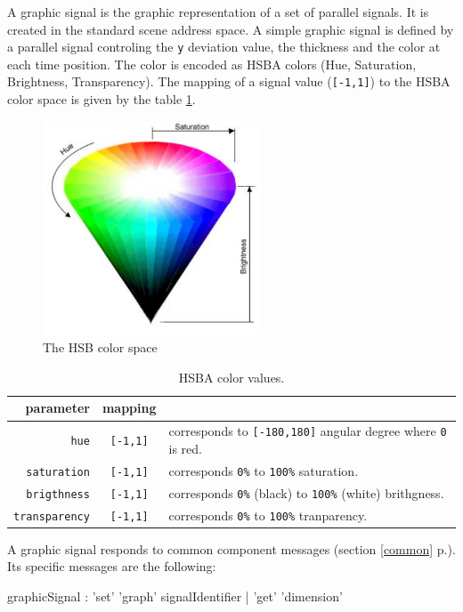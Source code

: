 \documentclass[a4paper,twoside]{report}
\newcommand{\fullref}[1]	{\ref{#1} p.\pageref{#1}}
\newcommand{\OSC}[1]		{\texttt{#1}}
\newcommand{\values}[1]		{\texttt{#1}}
\begin{document}
A graphic signal is the graphic representation of a set of parallel signals. It is created in the standard scene address space. A simple graphic signal is defined by a parallel signal controling the \values{y} deviation value, the thickness and the color at each time position. The color is encoded as HSBA colors (Hue, Saturation, Brightness, Transparency). The mapping of a signal value  (\values{[-1,1]}) to the HSBA color space is given by the table \ref{hsbamap}. 

\begin{figure}[h]
	\centering \includegraphics[width=65mm]{imgs/hsb}
 \caption{The HSB color space}
 \label{hsbfiug}
\end{figure}


\begin{table}[htdp]
\caption{HSBA color values.}
\begin{center}
\begin{tabular}{|r|cl|}
\hline
parameter & mapping & \\
\hline
\OSC{hue}				& \OSC{[-1,1]} & corresponds to \OSC{[-180,180]} angular degree where \OSC{0} is red. \\
\OSC{saturation}		& \OSC{[-1,1]} & corresponds \OSC{0\%} to \OSC{100\%} saturation. \\
\OSC{brigthness}		& \OSC{[-1,1]} & corresponds \OSC{0\%} (black) to \OSC{100\%} (white) brithgness. \\
\OSC{transparency}		& \OSC{[-1,1]} & corresponds \OSC{0\%} to \OSC{100\%} tranparency. \\
\hline
\end{tabular}
\end{center}
\label{hsbamap}
\end{table}



A graphic signal responds to common component messages (section \fullref{common}). Its specific messages are the following:
\begin{rail}
graphicSignal : 'set' 'graph' signalIdentifier 
			| 'get' 'dimension'
\end{rail}
\end{document}
